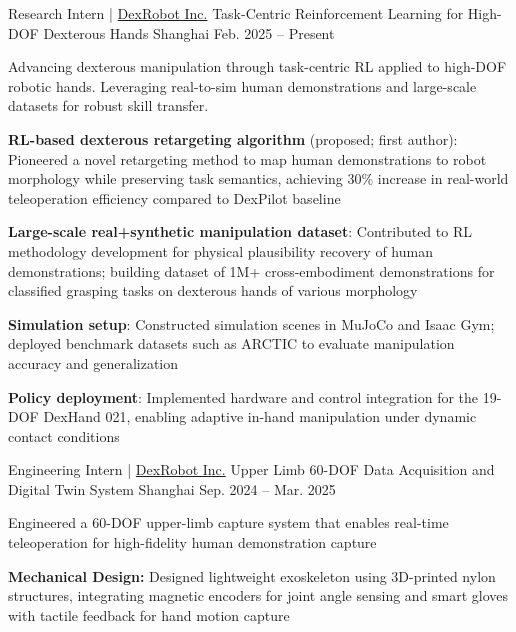 
\vspace{-8mm}

\begin{cventries}

    \cventry
      {Research Intern | \href{https://dex-robot.com}{DexRobot Inc.}} %
      {Task-Centric Reinforcement Learning for High-DOF Dexterous Hands} %
      {Shanghai} %
      {Feb. 2025 -- Present} %
      {
        Advancing dexterous manipulation through task-centric RL applied to high-DOF robotic hands. Leveraging real-to-sim human demonstrations and large-scale datasets for robust skill transfer.
        \begin{cvitems}
          \item{\textbf{RL-based dexterous retargeting algorithm} (proposed; first author): Pioneered a novel retargeting method to map human demonstrations to robot morphology while preserving task semantics, achieving 30\% increase in real-world teleoperation efficiency compared to DexPilot baseline}
          \item{\textbf{Large-scale real+synthetic manipulation dataset}: Contributed to RL methodology development for physical plausibility recovery of human demonstrations; building dataset of 1M+ cross-embodiment demonstrations for classified grasping tasks on dexterous hands of various morphology}
          \item{\textbf{Simulation setup}: Constructed simulation scenes in MuJoCo and Isaac Gym; deployed benchmark datasets such as ARCTIC to evaluate manipulation accuracy and generalization}
          \item{\textbf{Policy deployment}: Implemented hardware and control integration for the 19-DOF DexHand 021, enabling adaptive in-hand manipulation under dynamic contact conditions}
        \end{cvitems}
      }
  \cventry
    {Engineering Intern | \href{https://dex-robot.com}{DexRobot Inc.}} %
    {Upper Limb 60-DOF Data Acquisition and Digital Twin System} %
    {Shanghai} %
    {Sep. 2024 -- Mar. 2025} %
    {
      Engineered a 60-DOF upper-limb capture system that enables real-time teleoperation for high-fidelity human demonstration capture
      \begin{cvitems}
        \item{\textbf{Mechanical Design:} Designed lightweight exoskeleton using 3D-printed nylon structures, integrating magnetic encoders for joint angle sensing and smart gloves with tactile feedback for hand motion capture}

\end{cvitems}}
\end{cventries}
